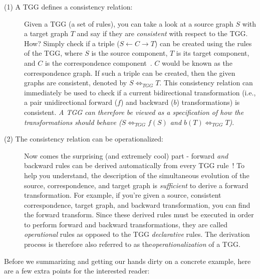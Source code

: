 \begin{description}

\item[(1) A TGG defines a consistency relation:]%
Given a TGG (a set of rul\-es), you can take a look at a source graph $S$ with a target graph $T$ and say if
they are \emph{consistent} with respect to the TGG. How?  Simply check if a triple ($S\leftarrow C\rightarrow T$) can be created using the rules of the TGG,
where $S$ is the source component, $T$ is its target component, and $C$ is the correspondence component~\cite{Hermann2011a}. $C$ would be known as the
correspondence graph. If such a triple can be created, then the given graphs are consistent, denoted by $S \Leftrightarrow_{TGG} T$. This consistency relation
can immediately be used to check if a current bidirectional transformation (i.e., a pair unidirectional forward ($f$) and backward ($b$) transformations) is
consistent. \emph{A TGG can therefore be viewed as a specification of how the transformations \emph{should} behave ($S \Leftrightarrow_{TGG} f(S)$ and $b(T)
\Leftrightarrow_{TGG} T$)}.
	
\item[(2) The consistency relation can be operationalized:]%
Now comes the surprising (and extremely cool) part - forward \emph{and} backward rules can be derived automatically from every TGG
rule~\cite{Giese2010,Hermann2011a}! To help you understand, the description of the simultaneous evolution of the source, correspondence, and target graph is
\emph{sufficient} to derive a forward transformation. For example, if you're given a source, consistent correspondence, target graph, and backward
transformation, you can find the forward transform. Since these derived rules must be executed in order to perform forward and backward transformations, they
are called \emph{operational} rules as opposed to the TGG \emph{declarative} rules. The derivation process is therefore also referred to as
the\emph{operationalization} of a TGG.
	
\end{description}

Before we summarizing and getting our hands dirty on a concrete example, here are a few extra points for the interested reader:  

